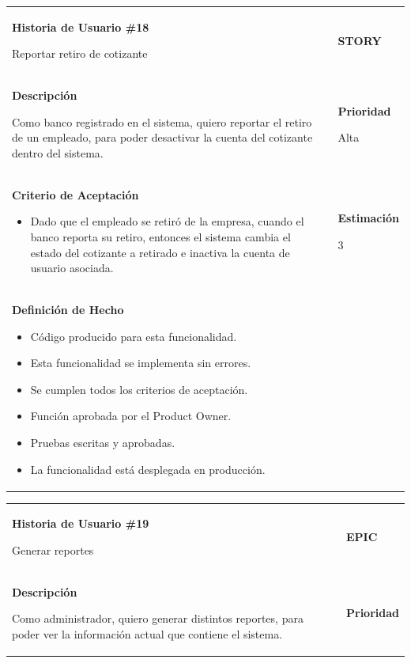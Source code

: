 \documentclass[12pt,a4paper]{article}
\begin{document}
\begin{center}
\begin{tabular}{| p{10cm} c p{2.5cm}|}
\hline 
\textbf{Historia de Usuario \#18}

Reportar retiro de cotizante & & \textbf{{\Large STORY}} \\ 
\textbf{Descripción}

Como banco registrado en el sistema, quiero reportar el retiro de un
empleado, para poder desactivar la cuenta del cotizante dentro del
sistema. &  & \textbf{Prioridad}

Alta\\

\textbf{Criterio de Aceptación}

\begin{itemize}
\item Dado que el empleado se retiró de la empresa, cuando el banco
reporta su retiro, entonces el sistema cambia el estado del
cotizante a retirado e inactiva la cuenta de usuario asociada.
\end{itemize} & & \textbf{Estimación}

3 \\ 

\textbf{Definición de Hecho}

\begin{itemize}
\item Código producido para esta funcionalidad.
\item Esta funcionalidad se implementa sin errores.
\item Se cumplen todos los criterios de aceptación.
\item Función aprobada por el Product Owner.
\item Pruebas escritas y aprobadas.
\item La funcionalidad está desplegada en producción.
\end{itemize} & & \\
\hline  
\end{tabular}
\vspace{5mm}

\begin{tabular}{|>{\columncolor[RGB]{215, 215, 215}} p{10cm} >{\columncolor[RGB]{215, 215, 215}} c >{\columncolor[RGB]{215, 215, 215}} p{2.5cm}|}
\hline 
\textbf{Historia de Usuario \#19}

Generar reportes & & \textbf{{\Large EPIC}} \\ 
\textbf{Descripción}

Como administrador, quiero generar distintos reportes, para poder ver la
información actual que contiene el sistema. &  & \textbf{Prioridad}


\end{tabular}
\end{center}
\end{document}
